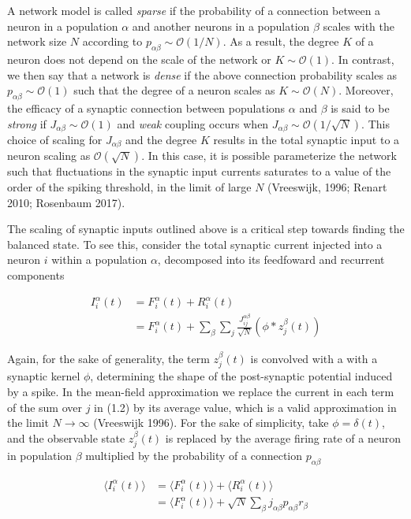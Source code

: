 \documentclass{ucetd}
\begin{document}
A network model is called \emph{sparse} if the probability of a connection between a neuron in a population $\alpha$ and another neurons in a population $\beta$ scales with the network size $N$ according to $p_{\alpha\beta} \sim \mathcal{O}(1/N)$. As a result, the degree $K$ of a neuron does not depend on the scale of the network or $K \sim \mathcal{O}(1)$. In contrast, we then say that a network is \emph{dense} if the above connection probability scales as $p_{\alpha\beta} \sim \mathcal{O}(1)$ such that the degree of a neuron scales as $K \sim \mathcal{O}(N)$. Moreover, the efficacy of a synaptic connection between populations $\alpha$ and $\beta$ is said to be \emph{strong} if $J_{\alpha\beta} \sim \mathcal{O}(1)$ and \emph{weak} coupling occurs when $J_{\alpha\beta} \sim \mathcal{O}(1/\sqrt{N})$. This choice of scaling for $J_{\alpha\beta}$ and the degree $K$ results in the total synaptic input to a neuron scaling as $\mathcal{O}(\sqrt{N})$. In this case, it is possible parameterize the network such that fluctuations in the synaptic input currents saturates to a value of the order of the spiking threshold, in the limit of large $N$ (Vreeswijk, 1996; Renart 2010; Rosenbaum 2017).  

The scaling of synaptic inputs outlined above is a critical step towards finding the balanced state. To see this, consider the total synaptic current injected into a neuron $i$ within a population $\alpha$, decomposed into its feedfoward and recurrent components

\begin{align}
I_{i}^{\alpha}(t) &= F_{i}^{\alpha}(t) + R_{i}^{\alpha}(t)\\
&= F_{i}^{\alpha}(t) + \sum_{\beta}\sum_{j} \frac{J_{ij}^{\alpha\beta}}{\sqrt{N}}(\phi * z^{\beta}_{j}(t))
\end{align}

Again, for the sake of generality, the term $z^{\beta}_{j}(t)$ is convolved with a with a synaptic kernel $\phi$, determining the shape of the post-synaptic potential induced by a spike. In the mean-field approximation we replace the current in each term of the sum over $j$ in (1.2) by its average value, which is a valid approximation in the limit $N\rightarrow\infty$ (Vreeswijk 1996). For the sake of simplicity, take $\phi = \delta(t)$, and the observable state $z^{\beta}_{j}(t)$ is replaced by the average firing rate of a neuron in population $\beta$ multiplied by the probability of a connection $p_{\alpha\beta}$

\begin{align*}
\langle I_{i}^{\alpha}(t)\rangle &= \langle F_{i}^{\alpha}(t)\rangle + \langle R_{i}^{\alpha}(t)\rangle\\
&= \langle F_{i}^{\alpha}(t)\rangle + \sqrt{N}\sum_{\beta}j_{\alpha\beta}p_{\alpha\beta}r_{\beta}
\end{align*}
\end{document}
